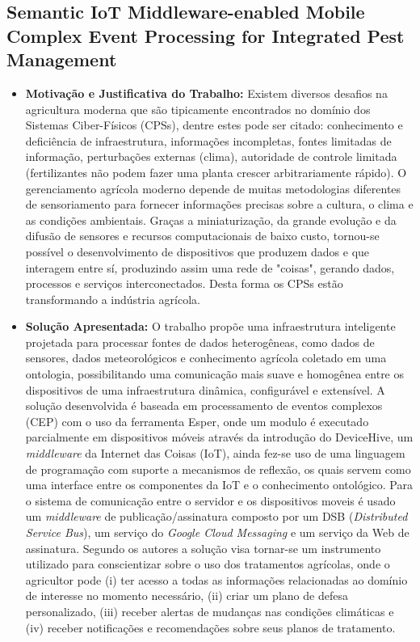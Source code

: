 \documentclass[tid,table]{texufpel} %
\begin{document}
\subsection{Semantic IoT Middleware-enabled Mobile Complex Event Processing for Integrated Pest Management}

\begin{itemize}
	\item \textbf{Motivação e Justificativa do Trabalho:} Existem diversos desafios na agricultura moderna que são tipicamente encontrados no domínio dos Sistemas Ciber-Físicos (CPSs), dentre estes pode ser citado: conhecimento e deficiência de infraestrutura, informações incompletas, fontes limitadas de informação, perturbações externas (clima), autoridade de controle limitada (fertilizantes não podem fazer uma planta crescer arbitrariamente rápido). O gerenciamento agrícola moderno depende  de muitas metodologias diferentes de sensoriamento para fornecer informações precisas sobre a cultura, o clima e as condições ambientais. Graças a miniaturização, da grande evolução e da difusão de sensores e recursos computacionais de baixo custo, tornou-se possível o desenvolvimento de dispositivos que produzem dados e que interagem entre sí, produzindo assim uma rede de "coisas", gerando dados, processos e serviços interconectados. Desta forma os CPSs estão transformando a indústria agrícola.
	
	\item \textbf{Solução Apresentada:} O trabalho propõe uma infraestrutura inteligente projetada para processar fontes de dados heterogêneas, como dados de sensores, dados meteorológicos e conhecimento agrícola coletado em uma ontologia, possibilitando uma comunicação mais suave e homogênea entre os dispositivos de uma infraestrutura dinâmica, configurável e extensível. A solução desenvolvida é baseada em processamento de eventos complexos (CEP) com o uso da ferramenta Esper, onde um modulo é executado parcialmente em dispositivos móveis através da introdução do DeviceHive, um \textit{middleware} da Internet das Coisas (IoT), ainda fez-se uso de uma linguagem de programação com suporte a mecanismos de reflexão, os quais servem como uma interface entre os componentes da IoT e o conhecimento ontológico. Para o sistema de comunicação entre o servidor e os dispositivos moveis é usado um \textit{middleware} de publicação/assinatura composto por um DSB (\textit{Distributed Service Bus}), um serviço do \textit{Google Cloud Messaging} e um serviço da Web de assinatura. Segundo os autores a solução visa tornar-se um instrumento utilizado para conscientizar sobre o uso dos tratamentos agrícolas, onde o agricultor pode (i) ter acesso a todas as informações relacionadas ao domínio de interesse no momento necessário, (ii) criar um plano de defesa personalizado, (iii) receber alertas de mudanças nas condições climáticas e (iv) receber notificações e recomendações sobre seus planos de tratamento.


\end{itemize}
\end{document}
